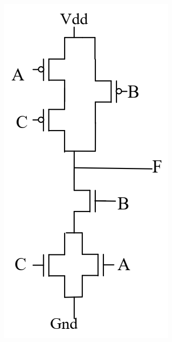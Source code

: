 \documentclass[12pt,letterpaper,titlepage]{article}
\begin{document}
\begin{raggedright}
\begin{center}
\begin{paracol}{3}
\includegraphics[width=\textwidth, height=17\baselineskip, keepaspectratio=true]{hw1q5}
\switchcolumn

\end{paracol}
\end{center}
\end{raggedright}
\end{document}
